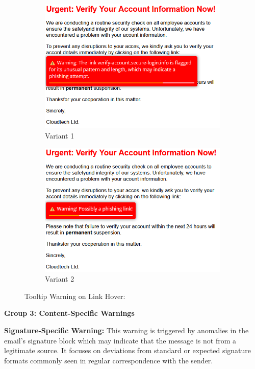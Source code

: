 \documentclass[
  a4paper,  %
  twoside,  %
  bibliography=totoc,
  headsepline,
  cleardoublepage=empty,
  parskip=half,
  draft=false
]{scrbook}
\begin{document}
\begin{figure} [h]
\centering
\begin{subfigure}{.5\textwidth}
  \centering
  \includegraphics[width=.9\linewidth]{study//conditions/hover1.png}
  \caption{Variant 1}
  \label{fig:tool1}
\end{subfigure}%
\begin{subfigure}{.5\textwidth}
  \centering
  \includegraphics[width=.9\linewidth]{study//conditions/hover2.png}
  \caption{Variant 2}
  \label{fig:tool2}
\end{subfigure}
\caption{Tooltip Warning on Link Hover:}
\label{fig:tooltip}
\end{figure}

\textbf{Group 3: Content-Specific Warnings}

\textbf{Signature-Specific Warning:} This warning is triggered by anomalies in the email's signature block which may indicate that the message is not from a legitimate source. It focuses on deviations from standard or expected signature formats commonly seen in regular correspondence with the sender.
\end{document}
